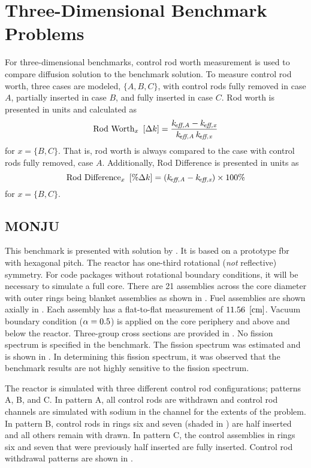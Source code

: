 \section{Three-Dimensional Benchmark Problems}
  For three-dimensional benchmarks, control rod worth measurement is used to
  compare diffusion solution to the benchmark solution. To measure control rod
  worth, three cases are modeled, $\{A,B,C\}$, with control rods fully removed
  in case $A$, partially inserted in case $B$, and fully inserted in case $C$.
  Rod worth is presented in units  and calculated as 
  \begin{equation}
    \text{Rod Worth}_x~\left[\text{{$\Delta k$}}\right] = \frac{k_{\!\mbox{\scriptsize \em eff,{A}}} - k_{\!\mbox{\scriptsize \em eff,{x}}}}
      {k_{\!\mbox{\scriptsize \em eff,{A}}} \, k_{\!\mbox{\scriptsize \em eff,{x}}}}
  \end{equation}
  for $x = \{B,C\}$. That is, rod worth is always compared to the case with
  control rods fully removed, case $A$. Additionally, Rod Difference is
  presented in units  as
  \begin{equation}
    \text{Rod Difference}_x~\left[\text{{$\% \Delta k$}}\right] = (k_{\!\mbox{\scriptsize \em eff,{A}}} - k_{\!\mbox{\scriptsize \em eff,{x}}}) 
      \times 100 \%
  \end{equation}
  for $x = \{B,C\}$.

  \subsection{MONJU}
    \label{sec:monju}
    This benchmark is presented with solution by \textcite{monjuBenchmark}.
    It is based on a prototype \gls{fbr} with hexagonal
    pitch. The reactor has one-third rotational (\textit{not} reflective)
    symmetry. For code packages without rotational boundary conditions, it will
    be necessary to simulate a full core. There are 21 assemblies across the
    core diameter with outer rings being blanket assemblies as shown in
    . Fuel assemblies are shown axially in
    . Each assembly has a flat-to-flat measurement of
    ${11.56~\left[\text{{cm}}\right]}$. Vacuum boundary condition ($\alpha = 0.5$) is applied
    on the core periphery and above and below the reactor. Three-group cross 
    sections are provided in . No fission spectrum is
    specified in the benchmark. The fission spectrum was estimated and is shown
    in . In determining this fission spectrum, it was
    observed that the benchmark results are not highly sensitive to the fission
    spectrum.

    The reactor is simulated with three different control rod configurations;
    patterns A, B, and C. In pattern A, all control rods are withdrawn and
    control rod channels are simulated with sodium in the channel for the
    extents of the problem. In pattern B, control rods in rings six and seven
    (shaded in ) are half inserted and all others remain
    with drawn. In pattern C, the control assemblies in rings six and seven that
    were previously half inserted are fully inserted. Control rod withdrawal
    patterns are shown in .
    

